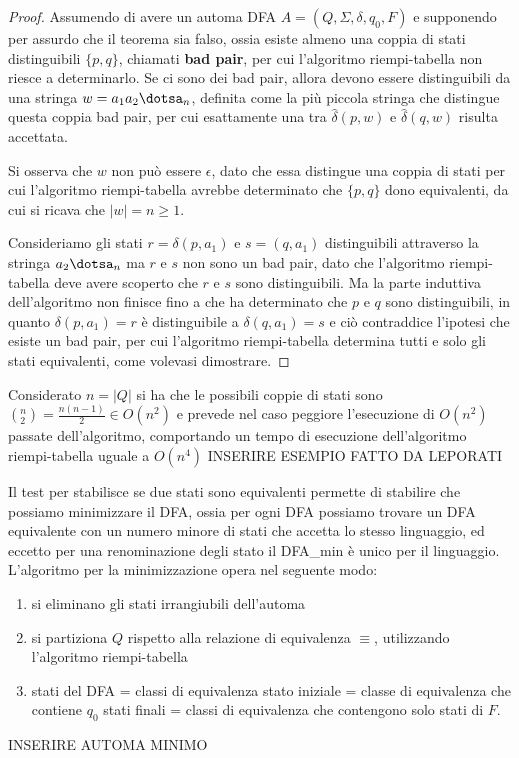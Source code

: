 \documentclass[a4paper]{book}
\theoremstyle{definition}%
\begin{document}
\begin{proof}
  Assumendo di avere un automa DFA $A = (Q, \Sigma, \delta, q_0, F)$ e supponendo per assurdo
  che il teorema sia falso, ossia esiste almeno una coppia di stati distinguibili $\{p, q\}$,
   chiamati \textbf{bad pair}, per cui l'algoritmo riempi-tabella non riesce a determinarlo.\newline
   Se ci sono dei bad pair, allora devono essere distinguibili da una stringa $w = a_1a_2\dotsa_n$,
   definita come la più piccola stringa che distingue questa coppia bad pair, per cui
   esattamente una tra $\hat{\delta}(p, w)$ e $\hat{\delta}(q, w)$ risulta accettata.

  Si osserva che $w$ non può essere $\epsilon$, dato che essa distingue una coppia di stati
  per cui l'algoritmo riempi-tabella avrebbe determinato che $\{p, q\}$ dono equivalenti,
  da cui si ricava che $|w| = n \geq 1$.

  Consideriamo gli stati $r = \delta(p, a_1)$ e $s = (q, a_1)$ distinguibili attraverso
  la stringa $a_2\dotsa_n$ ma $r$ e $s$ non sono un bad pair, dato che l'algoritmo riempi-tabella
  deve avere scoperto che $r$ e $s$ sono distinguibili.\newline
  Ma la parte induttiva dell'algoritmo non finisce fino a che ha determinato che $p$ e $q$
  sono distinguibili, in quanto $\delta(p, a_1) = r$ è distinguibile a $\delta(q, a_1) = s$
  e ciò contraddice l'ipotesi che esiste un bad pair, per cui l'algoritmo riempi-tabella
  determina tutti e solo gli stati equivalenti, come volevasi dimostrare.
\end{proof}
Considerato $n = |Q|$ si ha che le possibili coppie di stati sono $(^ n _ 2) = \frac{n(n-1)}{2} \in O(n^2)$ e prevede nel caso peggiore
l'esecuzione di $O(n^2)$ passate dell'algoritmo, comportando un tempo di esecuzione dell'algoritmo riempi-tabella uguale a $O(n^4)$
INSERIRE ESEMPIO FATTO DA LEPORATI

Il test per stabilisce se due stati sono equivalenti permette di stabilire che possiamo minimizzare il DFA, ossia per ogni DFA possiamo trovare
un DFA equivalente con un numero minore di stati che accetta lo stesso linguaggio, ed eccetto per una renominazione degli stato il DFA_{min} è
unico per il linguaggio.\newline
L'algoritmo per la minimizzazione opera nel seguente modo:
\begin{enumerate}
\item si eliminano gli stati irrangiubili dell'automa
\item si partiziona $Q$ rispetto alla relazione di equivalenza $\equiv$, utilizzando l'algoritmo riempi-tabella
\item stati del DFA = classi di equivalenza \newline
      stato iniziale = classe di equivalenza che contiene $q_0$\newline
      stati finali = classi di equivalenza che contengono solo stati di $F$.
\end{enumerate}
INSERIRE AUTOMA MINIMO
\end{document}
